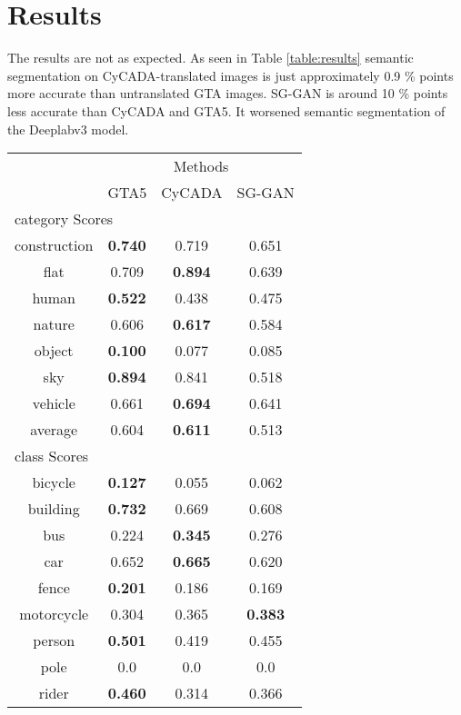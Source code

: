 \section{Results}
The results are not as expected. As seen in Table \ref{table:results} semantic segmentation on CyCADA-translated images is just approximately 0.9 \% points more accurate than untranslated GTA images. SG-GAN is around 10 \% points less accurate than CyCADA and GTA5. It worsened semantic segmentation of the Deeplabv3 model.
\begin{table}
	\centering
	\begin{tabular}{|c|c|c|c|}
		\multicolumn{1}{c}{} & \multicolumn{3}{c}{Methods}\\
		\cline{2-4}
		\multicolumn{1}{c|}{}& GTA5 & CyCADA & SG-GAN \\ 
		\cline{2-4}
		\multicolumn{4}{l}{category Scores}\\
		\hline
		construction & \textbf{0.740} & 0.719 & 0.651 \\ 
		\hline 
		flat & 0.709 & \textbf{0.894} & 0.639 \\ 
		\hline 
		human & \textbf{0.522} & 0.438 & 0.475 \\ 
		\hline 
		nature & 0.606 & \textbf{0.617} & 0.584 \\ 
		\hline 
		object & \textbf{0.100} & 0.077 & 0.085 \\ 
		\hline 
		sky & \textbf{0.894} & 0.841 & 0.518 \\ 
		\hline 
		vehicle & 0.661 & \textbf{0.694} & 0.641 \\ 
		\hline \hline
		average & 0.604 & \textbf{0.611} & 0.513\\
		\hline
		\multicolumn{4}{l}{class Scores}\\
		\hline
		bicycle & \textbf{0.127} & 0.055 & 0.062 \\ 
		\hline 
		building & \textbf{0.732} & 0.669 & 0.608 \\ 
		\hline 
		bus & 0.224 & \textbf{0.345} & 0.276 \\ 
		\hline 
		car & 0.652 & \textbf{0.665} & 0.620 \\ 
		\hline 
		fence & \textbf{0.201} & 0.186 & 0.169 \\ 
		\hline 
		motorcycle & 0.304 & 0.365 & \textbf{0.383} \\ 
		\hline 
		person & \textbf{0.501} & 0.419 & 0.455 \\ 
		\hline 
		pole & 0.0 & 0.0 & 0.0 \\ 
		\hline 
		rider & \textbf{0.460} & 0.314 & 0.366 \\ 

\end{tabular}
\end{table}

